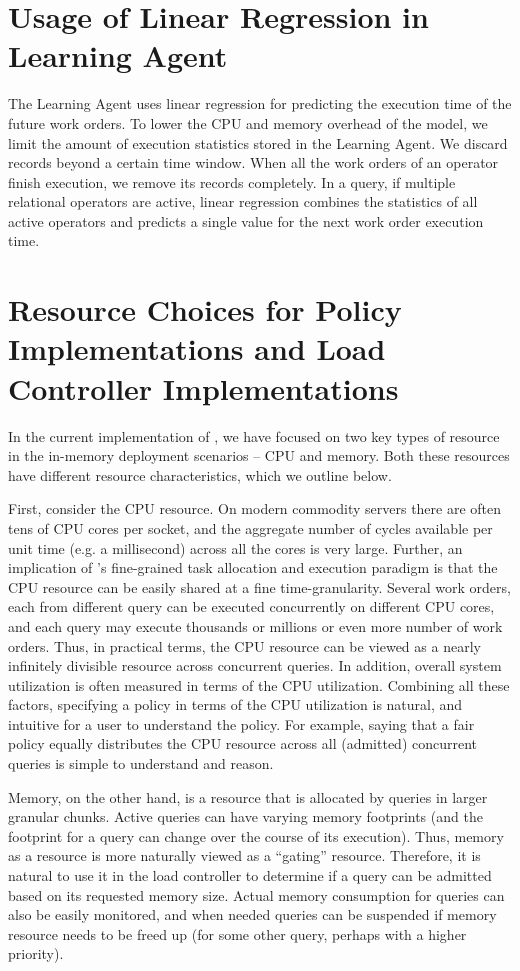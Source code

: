 \section{Usage of Linear Regression in Learning Agent}\label{apx:linear-regression-usage}
The Learning Agent uses linear regression for predicting the execution time of the future work orders.
To lower the CPU and memory overhead of the model, we limit the amount of execution statistics stored in the Learning Agent.
We discard records beyond a certain time window. 
When all the work orders of an operator finish execution, we remove its records completely. 
In a query, if multiple relational operators are active, linear regression combines the statistics of all active operators and predicts a single value for the next work order execution time.

\section{Resource Choices for Policy Implementations and Load Controller Implementations}\label{apx:resource-discussion}
In the current implementation of \sys{}, we have focused on two key types of resource in the in-memory deployment scenarios -- CPU and memory. 
Both these resources have different resource characteristics, which we outline below.

First, consider the CPU resource. 
On modern commodity servers there are often tens of CPU cores per socket, and the aggregate number of cycles available per unit time (e.g. a millisecond) across all the cores is very large. 
Further, an implication of \sys{}'s fine-grained task allocation and execution paradigm is that the CPU resource can be easily shared at a fine time-granularity. 
Several work orders, each from different query can be executed concurrently on different CPU cores, and each query may execute thousands or millions or even more number of work orders. 
Thus, in practical terms, the CPU resource can be viewed as a nearly infinitely divisible resource across concurrent queries. 
In addition, overall system utilization is often measured in terms of the CPU utilization. Combining all these factors, specifying a policy  in terms of the CPU utilization is natural, and intuitive for a user to understand the policy. 
For example, saying that a fair policy equally distributes the CPU resource across all (admitted) concurrent queries is simple to understand and reason. 

Memory, on the other hand, is a resource that is allocated by queries in larger granular chunks. 
Active queries can have varying memory footprints (and the footprint for a query can change over the course of its execution). 
Thus, memory as a resource is more naturally viewed as a ``gating'' resource. 
Therefore, it is natural to use it in the load controller to determine if a query can be admitted based on its requested memory size. 
Actual memory consumption for queries can also be easily monitored, and when needed queries can be suspended if memory resource needs to be freed up (for some other query, perhaps with a higher priority). 

